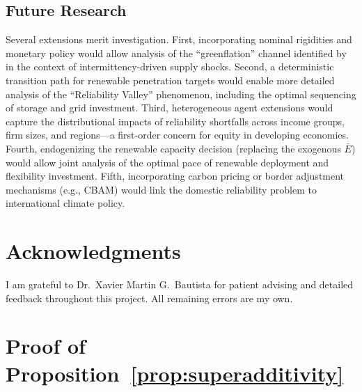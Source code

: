 \documentclass[12pt, a4paper]{article}
\begin{document}
\subsection*{Future Research}

Several extensions merit investigation. First, incorporating nominal rigidities and monetary policy would allow analysis of the ``greenflation'' channel identified by \citet{airaudo2025green} in the context of intermittency-driven supply shocks. Second, a deterministic transition path for renewable penetration targets would enable more detailed analysis of the ``Reliability Valley'' phenomenon, including the optimal sequencing of storage and grid investment. Third, heterogeneous agent extensions would capture the distributional impacts of reliability shortfalls across income groups, firm sizes, and regions---a first-order concern for equity in developing economies. Fourth, endogenizing the renewable capacity decision (replacing the exogenous $\bar{E}$) would allow joint analysis of the optimal pace of renewable deployment and flexibility investment. Fifth, incorporating carbon pricing or border adjustment mechanisms (e.g., CBAM) would link the domestic reliability problem to international climate policy.

\section*{Acknowledgments}

I am grateful to Dr.\ Xavier Martin G.\ Bautista for patient advising and detailed feedback throughout this project. All remaining errors are my own.




\appendix

\section{Proof of Proposition~\ref{prop:superadditivity}} \label{app:proof_superadditivity}
\end{document}
